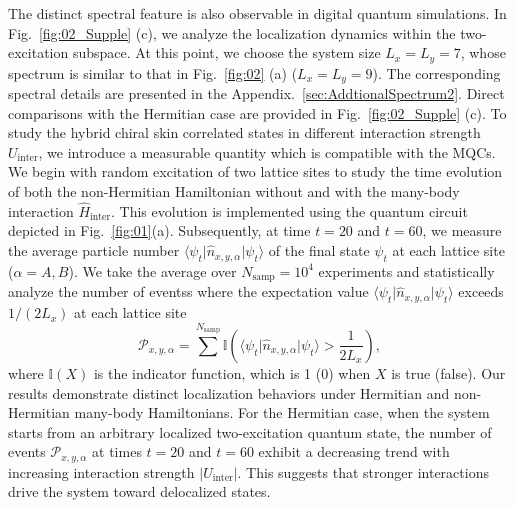 \documentclass[longbibliography, aps, prx, amsmath, amssymb, amsfonts, twocolumn,superscriptaddress, footinbib]{revtex4-1}
\begin{document}
	The distinct spectral feature is also observable in digital quantum simulations. In Fig.~\ref{fig:02_Supple} (c), we analyze the localization dynamics within the two-excitation subspace. At this point, we choose the system size $L_x=L_y=7$, whose spectrum is similar to that in Fig.~\ref{fig:02} (a) ($L_x=L_y=9$). The corresponding spectral details are presented in the Appendix.~\ref{sec:AddtionalSpectrum2}. Direct comparisons with the Hermitian case are provided in Fig.~\ref{fig:02_Supple} (c).
	To study the hybrid chiral skin correlated states in different interaction strength $U_{\text{inter}}$, we introduce a measurable quantity which is compatible with the MQCs. %
	We begin with random excitation of two lattice sites to
	study the time evolution of both the non-Hermitian Hamiltonian without and with the many-body interaction $\hat{H}_{\text{inter}}$. This evolution is implemented using the quantum circuit depicted in Fig.~\ref{fig:01}(a). Subsequently, at time $t=20$ and $t=60$, we measure the average particle number $\langle \psi_{t} \vert \hat{n}_{x,y,\alpha} \vert \psi_t \rangle$ of the final state $\psi_t$ at each lattice site ($\alpha=A,B$). We take the average over $N_{\text{samp}}=10^4$ experiments and statistically analyze the number of eventss where the expectation value $\langle \psi_{t} \vert \hat{n}_{x,y,\alpha} \vert \psi_t \rangle$ exceeds $1/(2L_x)$ at each lattice site
	\begin{equation}
		\mathcal{P}_{{x}, {y}, {\alpha}} = \sum^{N_{\text{samp}}} \mathbb{I}(\langle \psi_{t} \vert \hat{n}_{x,y,\alpha} \vert \psi_t \rangle > \frac{1}{2L_x}), \label{eq:NumbEvent}
	\end{equation}
	where $\mathbb{I}(X)$ is the indicator function, which is 1 (0) when $X$ is true (false).%
	Our results demonstrate distinct localization behaviors under Hermitian and non-Hermitian many-body Hamiltonians. For the Hermitian case, when the system starts from an arbitrary localized two-excitation quantum state, the number of events $\mathcal{P}_{x,y,\alpha}$ at times $t=20$ and $t=60$ exhibit a decreasing trend with increasing interaction strength $\vert U_{\text{inter}} \vert$. This suggests that stronger interactions drive the system toward delocalized states.
\end{document}
